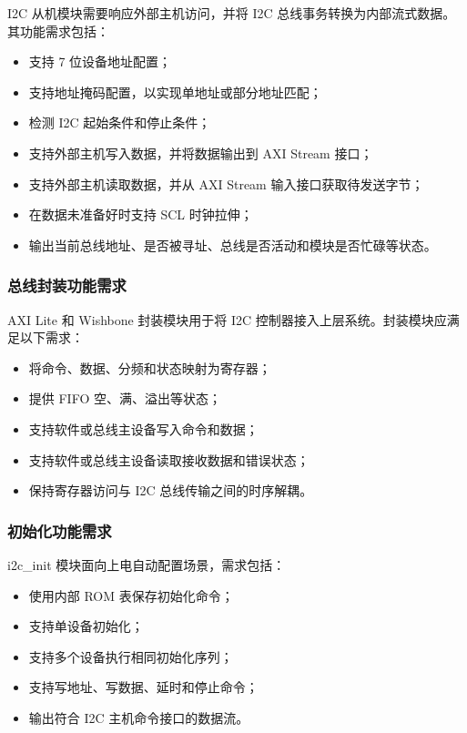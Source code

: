 \documentclass[12pt,a4paper]{article}
\numberwithin{equation}{section}
\providecommand{\tightlist}{%
  \setlength{\itemsep}{0pt}\setlength{\parskip}{0pt}}
\begin{document}
I2C 从机模块需要响应外部主机访问，并将 I2C
总线事务转换为内部流式数据。其功能需求包括：

\begin{itemize}
\tightlist
\item
  支持 7 位设备地址配置；
\item
  支持地址掩码配置，以实现单地址或部分地址匹配；
\item
  检测 I2C 起始条件和停止条件；
\item
  支持外部主机写入数据，并将数据输出到 AXI Stream 接口；
\item
  支持外部主机读取数据，并从 AXI Stream 输入接口获取待发送字节；
\item
  在数据未准备好时支持 SCL 时钟拉伸；
\item
  输出当前总线地址、是否被寻址、总线是否活动和模块是否忙碌等状态。
\end{itemize}

\subsubsection{总线封装功能需求}\label{ux603bux7ebfux5c01ux88c5ux529fux80fdux9700ux6c42}

AXI Lite 和 Wishbone 封装模块用于将 I2C
控制器接入上层系统。封装模块应满足以下需求：

\begin{itemize}
\tightlist
\item
  将命令、数据、分频和状态映射为寄存器；
\item
  提供 FIFO 空、满、溢出等状态；
\item
  支持软件或总线主设备写入命令和数据；
\item
  支持软件或总线主设备读取接收数据和错误状态；
\item
  保持寄存器访问与 I2C 总线传输之间的时序解耦。
\end{itemize}

\subsubsection{初始化功能需求}\label{ux521dux59cbux5316ux529fux80fdux9700ux6c42}

i2c\_init 模块面向上电自动配置场景，需求包括：

\begin{itemize}
\tightlist
\item
  使用内部 ROM 表保存初始化命令；
\item
  支持单设备初始化；
\item
  支持多个设备执行相同初始化序列；
\item
  支持写地址、写数据、延时和停止命令；
\item
  输出符合 I2C 主机命令接口的数据流。
\end{itemize}
\end{document}
